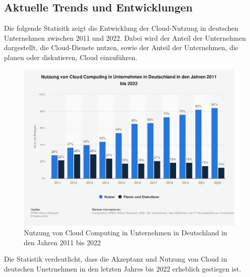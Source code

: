 \documentclass[12pt,bibtotoc]{article}
\begin{document}
			
			\subsection{Aktuelle Trends und Entwicklungen}
			Die folgende Statisitk zeigt die Entwicklung der Cloud-Nutzung in deutschen Unternehmen zwischen 2011 und 2022.
			Dabei wird der Anteil der Unternehmen dargestellt, die Cloud-Dienste nutzen, sowie der Anteil der Unternehmen, die planen oder diskutieren, Cloud einzuführen. 
			\begin{figure}[H] %
				\centering
				\includegraphics[keepaspectratio,width=\textwidth,height=\textheight]{"Content/Pictures/Nutzung von Cloud Computing in Unternehmen in Deutschland in den Jahren 2011 bis 2022.png"} 
				\renewcommand{\figurename}{Abb.}
				\caption{\small Nutzung von Cloud Computing in Unternehmen in Deutschland in den Jahren 2011 bis 2022}
			\end{figure}
			Die Statistik verdeutlicht, dass die Akzeptanz und Nutzung von Cloud in deutschen Unetrnehmen in den letzten Jahres bis 2022 erheblich gestiegen ist. 
	
			\newpage
\end{document}
